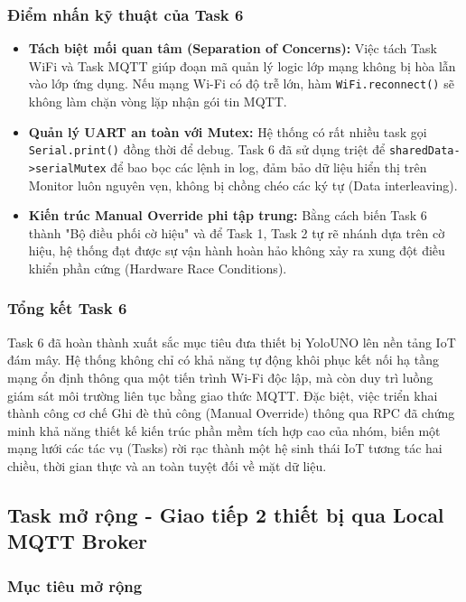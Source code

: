 \subsubsection*{Điểm nhấn kỹ thuật của Task 6}

\begin{itemize}
    \item \textbf{Tách biệt mối quan tâm (Separation of Concerns):} Việc tách Task WiFi và Task MQTT giúp đoạn mã quản lý logic lớp mạng không bị hòa lẫn vào lớp ứng dụng. Nếu mạng Wi-Fi có độ trễ lớn, hàm \texttt{WiFi.reconnect()} sẽ không làm chặn vòng lặp nhận gói tin MQTT.
    \item \textbf{Quản lý UART an toàn với Mutex:} Hệ thống có rất nhiều task gọi \texttt{Serial.print()} đồng thời để debug. Task 6 đã sử dụng triệt để \texttt{sharedData->serialMutex} để bao bọc các lệnh in log, đảm bảo dữ liệu hiển thị trên Monitor luôn nguyên vẹn, không bị chồng chéo các ký tự (Data interleaving).
    \item \textbf{Kiến trúc Manual Override phi tập trung:} Bằng cách biến Task 6 thành "Bộ điều phối cờ hiệu" và để Task 1, Task 2 tự rẽ nhánh dựa trên cờ hiệu, hệ thống đạt được sự vận hành hoàn hảo không xảy ra xung đột điều khiển phần cứng (Hardware Race Conditions).
\end{itemize}

\subsubsection*{Tổng kết Task 6}

Task 6 đã hoàn thành xuất sắc mục tiêu đưa thiết bị YoloUNO lên nền tảng IoT đám mây. Hệ thống không chỉ có khả năng tự động khôi phục kết nối hạ tầng mạng ổn định thông qua một tiến trình Wi-Fi độc lập, mà còn duy trì luồng giám sát môi trường liên tục bằng giao thức MQTT. Đặc biệt, việc triển khai thành công cơ chế Ghi đè thủ công (Manual Override) thông qua RPC đã chứng minh khả năng thiết kế kiến trúc phần mềm tích hợp cao của nhóm, biến một mạng lưới các tác vụ (Tasks) rời rạc thành một hệ sinh thái IoT tương tác hai chiều, thời gian thực và an toàn tuyệt đối về mặt dữ liệu.
\subsection{Task mở rộng - Giao tiếp 2 thiết bị qua Local MQTT Broker}

\subsubsection*{Mục tiêu mở rộng}

